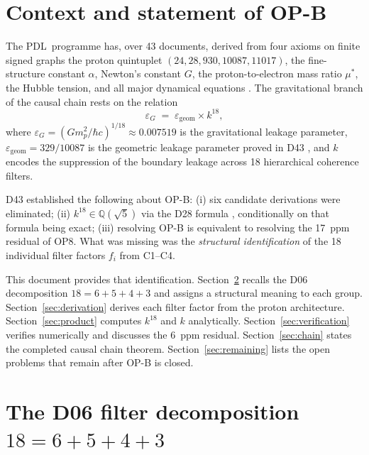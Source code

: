 \documentclass[12pt,a4paper]{article}
\theoremstyle{plain}
\theoremstyle{definition}
\theoremstyle{remark}
\newcommand{\PDL}{\textsc{PDL}}
\newcommand{\egeom}{\varepsilon_{\mathrm{geom}}}
\newcommand{\eG}{\varepsilon_G}
\begin{document}
\tableofcontents
\newpage

\section{Context and statement of OP-B}
\label{sec:context}

The \PDL\ programme has, over 43 documents, derived from four axioms on finite signed graphs the proton quintuplet $(24,28,930,10087,11017)$, the fine-structure constant $\alpha$, Newton's constant $G$, the proton-to-electron mass ratio $\mu^*$, the Hubble tension, and all major dynamical equations \citep{D43}. The gravitational branch of the causal chain rests on the relation
\[
\eG \;=\; \egeom \times k^{18},
\]
where $\eG = (Gm_p^2/\hbar c)^{1/18} \approx 0.007519$ is the gravitational leakage parameter, $\egeom = 329/10087$ is the geometric leakage parameter proved in D43 \citep{D43}, and $k$ encodes the suppression of the boundary leakage across 18 hierarchical coherence filters.

D43 \citep{D43} established the following about OP-B: (i) six candidate derivations were eliminated; (ii) $k^{18} \in \mathbb{Q}(\sqrt{5})$ via the D28 formula \citep{D28}, conditionally on that formula being exact; (iii) resolving OP-B is equivalent to resolving the 17~ppm residual of OP8. What was missing was the \emph{structural identification} of the 18 individual filter factors $f_i$ from C1--C4.

This document provides that identification. Section~\ref{sec:filters} recalls the D06 \citep{D06} decomposition $18 = 6+5+4+3$ and assigns a structural meaning to each group. Section~\ref{sec:derivation} derives each filter factor from the proton architecture. Section~\ref{sec:product} computes $k^{18}$ and $k$ analytically. Section~\ref{sec:verification} verifies numerically and discusses the 6~ppm residual. Section~\ref{sec:chain} states the completed causal chain theorem. Section~\ref{sec:remaining} lists the open problems that remain after OP-B is closed.

\section{The D06 filter decomposition \texorpdfstring{$18 = 6+5+4+3$}{18=6+5+4+3}}
\label{sec:filters}
\end{document}
